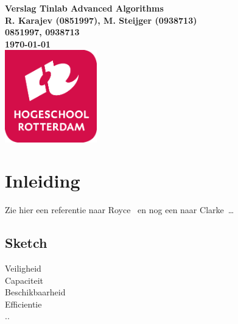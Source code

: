 \documentclass{article}
\begin{document}
\sffamily
\begin{titlepage}
  \centering
    \vfill
    {
        \bfseries\Huge Verslag Tinlab Advanced Algorithms \\
        \vskip2cm
        }
        {\bfseries\Large
          R. Karajev (0851997), M. Steijger (0938713)\\
        }
        {
          \bfseries\normalsize
          0851997, 0938713\\
          \vskip1cm
          \today\\
    }    
    \vfill
    \includegraphics[width=4cm]{logohr.png} %
    \vfill
    \vfill
\end{titlepage}
\newpage
\tableofcontents

\newpage
\section{Inleiding}
Zie hier een referentie naar Royce~\cite{royce1987managing} en nog een naar Clarke~\cite{modelchecking}\ldots 

\subsection{Sketch}
Veiligheid \\
Capaciteit \\
Beschikbaarheid \\
Efficientie \\
.. \\

\newpage
\end{document}
